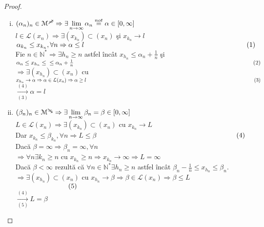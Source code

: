 \documentclass[ a4paper, 12pt]{report}
\theoremstyle{remark}
\numberwithin{equation}{section}
\begin{document}
\begin{proof}
\begin{enumerate}[(i)]
\item $(\alpha_n)_n \in \mathcal{M}^{\mc} \Rightarrow \exists \lim\limits_{n \rightarrow \infty} \alpha_n \stackrel{not}{=} \alpha \in [0,\infty]$\\
$l \in \mathcal{L}(x_n) \Rightarrow \exists (x_{k_n}) \subset (x_n)$ \c si $x_{k_n}\rightarrow l$\\
$\alpha_{k_n} \leq x_{k_n}, \forall n \Rightarrow \alpha \leq l \hspace{84mm} (1)$\\
Fie $n \in \mathbb{N}^\ast \Rightarrow \exists h_n \geq n $ astfel \^inc\^at $x_{h_n} \leq \alpha_n + \frac{1}{n}$ \c si $\alpha_n \leq x_{h_n} \leq \\
\leq \alpha_n + \frac{1}{n} \hspace{109mm} (2)$\\
$\Rightarrow \exists (x_{h_n}) \subset (x_n)$ cu $x_{h_n} \rightarrow \alpha \Rightarrow \alpha \in \mathcal{L}(x_n) \Rightarrow\\ \alpha \geq l \hspace{115mm} (3)$\\
$\xrightarrow[(3)]{(4)} \alpha = l$\\
\item $(\beta_n)_n \in \mathcal{M}^{\md} \Rightarrow \exists \lim\limits_{n \rightarrow \infty} \beta_n = \beta \in [0,\infty]$\\
$L \in \mathcal{L}(x_n) \Rightarrow \exists (x_{k_n}) \subset (x_n)$ cu $x_{k_n} \rightarrow L$\\
Dar $x_{k_n} \leq \beta_{k_n}, \forall n \Rightarrow L \leq \beta$ $\hspace{71mm}(4)$\\
Dac\u a $\beta=\infty \Rightarrow \beta_n = \infty, \forall n$\\
$\Rightarrow \forall n \exists k_n\geq n$ cu $x_{k_n} \geq n \Rightarrow x_{k_n} \rightarrow \infty \Rightarrow L=\infty$\\
Dac\u a $\beta < \infty$ rezult\u a c\u a $\forall n \in \mathbb{N}^\ast \exists h_n \geq n $ astfel \^inc\^at $\beta_n - \frac{1}{n} \leq x_{h_n} \leq \beta_n.$\\
$\Rightarrow \exists (x_{h_n}) \subset (x_n)$ cu $x_{h_n} \rightarrow \beta \Rightarrow \beta \in \mathcal{L}(x_n) \Rightarrow \beta \leq L$ $\hspace{27mm} (5)$\\
$\xrightarrow[(5)]{(4)} L = \beta $
\end{enumerate}
\end{proof}
\end{document}
